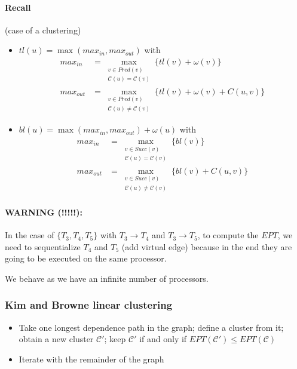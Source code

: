 \paragraph{Recall} (case of a clustering)
\begin{itemize}
\item $tl(u)=\max (max_{in},max_{out})$ with
\begin{align*}
max_{in}&=\max_{\substack{v\in Pred(v)\\\mathcal{C}(u)=\mathcal{C}(v)}} \{ tl(v)+\omega (v) \}\\
max_{out}&=\max_{\substack{v\in Pred(v)\\\mathcal{C}(u)\neq\mathcal{C}(v)}} \{ tl(v)+\omega (v) + C(u,v) \}
\end{align*}

\item $bl(u)=\max (max_{in},max_{out}) + \omega(u)$ with
\begin{align*}
max_{in}&=\max_{\substack{v\in Succ(v)\\\mathcal{C}(u)=\mathcal{C}(v)}} \{ bl(v) \}\\
max_{out}&=\max_{\substack{v\in Succ(v)\\\mathcal{C}(u)\neq\mathcal{C}(v)}} \{ bl(v) + C(u,v) \}
\end{align*}
\end{itemize}


\paragraph{WARNING (!!!!!):} In the case of $\{T_3,T_4,T_5\}$ with $T_3 \to T_4$ and $T_3 \to T_5$, to compute the $EPT$, we need to sequentialize $T_4$ and $T_5$ (add virtual edge) because in the end they are going to be executed on the same processor.

We behave as we have an infinite number of processors.

\subsubsection*{Kim and Browne linear clustering}
\begin{itemize}
\item Take one longest dependence path in the graph; define a cluster from it; obtain a new cluster $\mathcal{C}'$; keep $\mathcal{C}'$ if and only if $EPT(\mathcal{C'})\leq EPT(\mathcal{C})$
\item Iterate with the remainder of the graph
\end{itemize}


